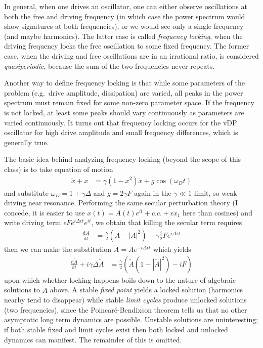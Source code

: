 \documentclass[10pt]{article}
\newcommand{\rd}[2]{\frac{\mathrm{d}#1}{\mathrm{d}#2}}
\newcommand{\abs}[1]{\left|#1\right|}
\begin{document}
In general, when one drives an oscillator, one can either observe oscillations
at both the free and driving frequency (in which case the power spectrum would
show signatures at both frequencies), or we would see only a single frequency
(and maybe harmonics). The latter case is called \emph{frequency locking}, when
the driving frequency locks the free oscillation to some fixed frequency. The
former case, when the driving and free oscillations are in an irrational ratio,
is considered \emph{quasiperiodic}, because the sum of the two frequencies never
repeats.

Another way to define frequency locking is that while some parameters of the
problem (e.g.\ drive amplitude, dissipation) are varied, all peaks in the power
spectrum must remain fixed for some non-zero parameter space. If the frequency
is not locked, at least some peaks should vary continuously as parameters are
varied continuously. It turns out that frequency locking occurs for the vDP
oscillator for high drive amplitude and small frequency differences, which is
generally true.

The basic idea behind analyzing frequency locking (beyond the scope of this
class) is to take equation of motion
\begin{align}
    \ddot{x} + x &= \gamma(1-x^2)\dot{x} + g\cos(\omega_D t)
\end{align}
and substitute $\omega_D = 1 + \gamma \Delta$ and $g = 2\gamma F$ again in the
$\gamma \ll 1$ limit, so weak driving near resonance. Performing the same
secular perturbation theory (I concede, it is easier to use $x(t) = A(t)e^{it} +
c.c. + \epsilon x_1$ here than cosines) and write driving term $\epsilon F e^{i
\Delta \epsilon t}e^{it}$, we obtain that killing the secular term requires
\begin{align}
    \rd{A}{t} &= \frac{\gamma}{2}\left( A - \abs{A}^2 \right) -
    \gamma\frac{i}{2}Fe^{i\Delta \epsilon t}
\end{align}
then we can make the substitution $\tilde{A} = Ae^{-i\Delta \epsilon t}$ which
yields
\begin{align}
    \rd{\tilde{A}}{t} + i\gamma \Delta \tilde{A} &= \frac{\gamma}{2}\left(
    \tilde{A}(1-\abs{\tilde{A}}^2) - iF \right)
\end{align}
upon which whether locking happens boils down to the nature of algebraic
solutions to $\tilde{A}$ above. A stable \emph{fixed point} yields a locked
solution (harmonics nearby tend to disappear) while stable \emph{limit cycles}
produce unlocked solutions (two frequencies), since the Poincar\'e-Bendixson
theorem tells us that no other asymptotic long term dynamics are possible.
Unstable solutions are uninteresting; if both stable fixed and limit cycles
exist then both locked and unlocked dynamics can manifest. The remainder of this
is omitted.
\end{document}
